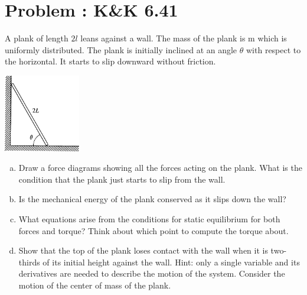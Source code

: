 \documentclass[problems]{esg8012pset}
\begin{document}
\section{Problem \thesection: K\&K 6.41}
  A plank of length $2 l$ leans against a wall. The mass of the plank is m which is uniformly distributed. The plank is initially inclined at an angle $\theta$ with respect to the horizontal. It starts to slip downward without friction.
  \begin{center}\includegraphics[width=0.25\textwidth]{ps09_7}\end{center}
  \begin{enumerate}[(a)]
    \item Draw a force diagrams showing all the forces acting on the plank. What is the condition that the plank just starts to slip from the wall.
    \item Is the mechanical energy of the plank conserved as it slips down the wall?
    \item What equations arise from the conditions for static equilibrium for both forces and torque? Think about which point to compute the torque about.
    \item Show that the top of the plank loses contact with the wall when it is two-thirds of its initial height against the wall. Hint: only a single variable and its derivatives are needed to describe the motion of the system. Consider the motion of the center of mass of the plank.
  \end{enumerate}
\end{document}
